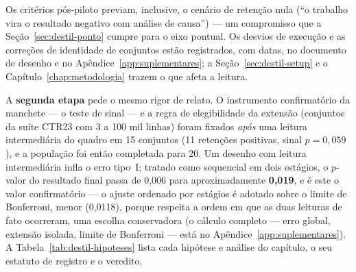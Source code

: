 Os critérios pós-piloto previam, inclusive, o cenário de retenção
nula (``o trabalho vira o resultado negativo com análise de causa'')
--- um compromisso que a Seção~\ref{sec:destil-ponto} cumpre para o
eixo pontual. Os desvios de execução e as correções de identidade de
conjuntos estão registrados, com datas, no documento de desenho e no
Apêndice~\ref{app:suplementares}; a Seção~\ref{sec:destil-setup} e o
Capítulo~\ref{chap:metodologia} trazem o que afeta a leitura.

A \textbf{segunda etapa} pede o mesmo rigor de relato. O instrumento
confirmatório da manchete --- o teste de sinal --- e a regra de
elegibilidade da extensão (conjuntos da suíte CTR23 com 3 a 100 mil
linhas) foram fixados \emph{após} uma leitura
intermediária do quadro em 15 conjuntos (11 retenções positivas,
sinal $p=0{,}059$), e a população foi então completada para 20. Um
desenho com leitura intermediária infla o erro tipo~I; tratado como
sequencial em dois estágios, o $p$-valor do resultado final passa de
0,006 para aproximadamente \textbf{0,019}, e é este o valor
confirmatório --- o ajuste ordenado por estágios é adotado sobre o
limite de Bonferroni, menor (0,0118), porque respeita a ordem em que
as duas leituras de fato ocorreram, uma escolha conservadora (o
cálculo completo --- erro global, extensão isolada,
limite de Bonferroni --- está no Apêndice~\ref{app:suplementares}).
A Tabela~\ref{tab:destil-hipoteses} lista cada hipótese e análise do
capítulo, o seu estatuto de registro e o veredito.

